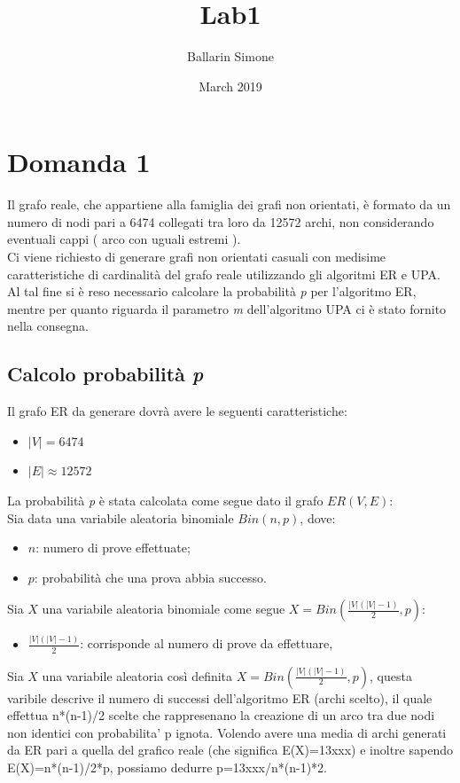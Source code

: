 \documentclass{article}
\title{Lab1}
\author{Ballarin Simone }
\date{March 2019}
\begin{document}
\maketitle

\section*{Domanda 1}
Il grafo reale, che appartiene alla famiglia dei grafi non orientati, è formato da un numero di nodi pari a 6474 collegati tra loro da 12572 archi, non considerando eventuali cappi ( arco con uguali estremi ).\\
Ci viene richiesto di generare grafi non orientati casuali con medisime caratteristiche di cardinalità del grafo reale utilizzando gli algoritmi ER e UPA.\\
Al tal fine si è reso necessario calcolare la probabilità \textit{p} per l'algoritmo ER, mentre per quanto riguarda il parametro \textit{m} dell'algoritmo UPA ci è stato fornito nella consegna.\\
\subsection*{Calcolo probabilità \textit{p}}
Il grafo ER da generare dovrà avere le seguenti caratteristiche:
\begin{itemize}
    \item $|V|= 6474$
    \item $|E| \approx 12572$
\end{itemize}
La probabilità \textit{p} è stata calcolata come segue dato il grafo $ER(V,E)$:\\
Sia data una variabile aleatoria binomiale $Bin(n,p)$, dove:
\begin{itemize}
    \item $n$: numero di prove effettuate;
    \item $p$: probabilità che una prova abbia successo.
\end{itemize} 
Sia $X$ una variabile aleatoria binomiale come segue $X=Bin(\frac{|V|(|V|-1)}{2},p)$:
\begin{itemize}
    \item $\frac{|V|(|V|-1)}{2}$: corrisponde al numero di prove da effettuare, 
\end{itemize}
 


Sia $X$ una variabile aleatoria così definita $X=Bin(\frac{|V|(|V|-1)}{2},p)$, questa varibile descrive il numero di successi dell'algoritmo ER (archi scelto), il quale effettua n*(n-1)/2 scelte che rappresenano la creazione di un arco tra due nodi non identici con probabilita' p ignota.
Volendo avere una media di archi generati da ER pari a quella del grafico reale (che significa E(X)=13xxx) e inoltre sapendo E(X)=n*(n-1)/2*p, possiamo dedurre p=13xxx/n*(n-1)*2.
\end{document}
